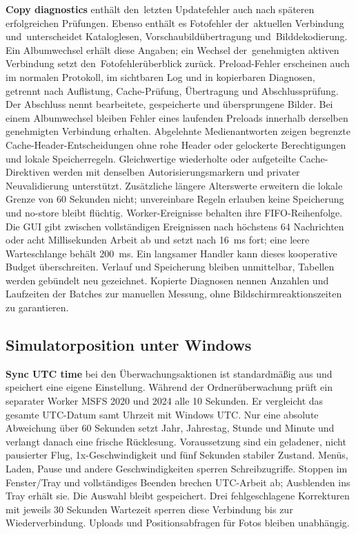 \documentclass[11pt,a4paper]{article}
\newcommand{\ui}[1]{\textbf{#1}}
\begin{document}
\ui{Copy diagnostics} enthält den~letzten Updatefehler auch nach späteren
erfolgreichen Prüfungen. Ebenso enthält es Fotofehler der~aktuellen Verbindung
und~unterscheidet Kataloglesen, Vorschaubildübertragung und~Bilddekodierung.
Ein Albumwechsel erhält diese Angaben; ein Wechsel der~genehmigten aktiven
Verbindung setzt den~Fotofehlerüberblick zurück.
Preload-Fehler erscheinen auch im normalen Protokoll, im sichtbaren Log und
in kopierbaren Diagnosen, getrennt nach Auflistung, Cache-Prüfung, Übertragung
und Abschlussprüfung. Der Abschluss nennt bearbeitete, gespeicherte und
übersprungene Bilder. Bei einem Albumwechsel bleiben Fehler eines laufenden
Preloads innerhalb derselben genehmigten Verbindung erhalten. Abgelehnte
Medienantworten zeigen begrenzte Cache-Header-Entscheidungen ohne rohe Header
oder gelockerte Berechtigungen und lokale Speicherregeln.
Gleichwertige wiederholte oder aufgeteilte Cache-Direktiven werden mit denselben
Autorisierungsmarkern und privater Neuvalidierung unterstützt. Zusätzliche
längere Alterswerte erweitern die lokale Grenze von 60 Sekunden nicht;
unvereinbare Regeln erlauben keine Speicherung und no-store bleibt flüchtig.
Worker-Ereignisse behalten ihre FIFO-Reihenfolge. Die GUI gibt zwischen
vollständigen Ereignissen nach höchstens 64 Nachrichten oder acht Millisekunden
Arbeit ab und setzt nach 16~ms fort; eine leere Warteschlange behält 200~ms.
Ein langsamer Handler kann dieses kooperative Budget überschreiten. Verlauf
und Speicherung bleiben unmittelbar, Tabellen werden gebündelt neu gezeichnet.
Kopierte Diagnosen nennen Anzahlen und Laufzeiten der Batches zur manuellen
Messung, ohne Bildschirmreaktionszeiten zu garantieren.

\subsection{Simulatorposition unter Windows}

\ui{Sync UTC time} bei den Überwachungsaktionen ist standardmäßig aus und
speichert eine eigene Einstellung. Während der Ordnerüberwachung prüft ein
separater Worker MSFS 2020 und 2024 alle 10 Sekunden. Er vergleicht das gesamte
UTC-Datum samt Uhrzeit mit Windows UTC. Nur eine absolute Abweichung über
60 Sekunden setzt Jahr, Jahrestag, Stunde und Minute und verlangt danach eine
frische Rücklesung. Voraussetzung sind ein geladener, nicht pausierter Flug,
1x-Geschwindigkeit und fünf Sekunden stabiler Zustand. Menüs, Laden, Pause und
andere Geschwindigkeiten sperren Schreibzugriffe. Stoppen im Fenster/Tray und
vollständiges Beenden brechen UTC-Arbeit ab; Ausblenden ins Tray erhält sie.
Die Auswahl bleibt gespeichert. Drei fehlgeschlagene Korrekturen mit jeweils
30 Sekunden Wartezeit sperren diese Verbindung bis zur Wiederverbindung.
Uploads und Positionsabfragen für Fotos bleiben unabhängig.
\end{document}
